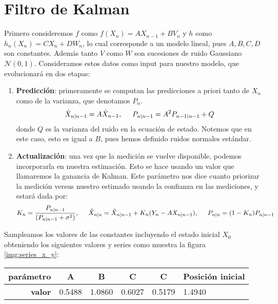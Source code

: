 \documentclass[letterpaper,11pt,oneside]{article}
\begin{document}
\section{Filtro de Kalman}
Primero consideremos $f$ como $ f(X_n) = A X_{n-1} + B V_n$ y $h$ como $ h_n(X_n) = C X_n + DW_n$, lo cual corresponde a un modelo lineal, pues $A,B,C,D$ son constantes. Además tanto $V$ como $W$ son sucesiones de ruido Gaussiano $\mathcal{N}(0,1)$. Consideramos estos datos como input para nuestro modelo, que evolucionará en dos etapas:
\begin{enumerate}
    \item \textbf{Predicción}: primeramente se computan las predicciones a priori tanto de $X_n$ como de la varianza, que denotamos $P_n$.
    $$ \hat X_{n|n-1} = A \hat X_{n-1},\hspace{.5cm} P_{n|n-1} = A^2 P_{n-1|n-1} + Q$$
    donde $Q$ es la varianza del ruido en la ecuación de estado. Notemos que en este caso, esto es igual a $B$, pues hemos definido ruidos normales estándar.
    \item \textbf{Actualización}: una vez que la medición se vuelve disponible, podemos incorporarla en nuestra estimación. Esto se hace usando un valor que llamaremos la ganancia de Kalman. Este parámetro nos dice cuanto priorizar la medición versus nuestro estimado usando la confianza en las mediciones, y estará dada por:
    $$ K_n = \frac{P_{n|n-1}}{(P_{n|n-1}+\sigma^2)},\hspace{.5cm} \hat X_{n|n}=\hat X_{n|n-1}+K_n(Y_n-AX_{n|n-1}),\hspace{.5cm} P_{n|n}=(1-K_n)P_{n|n-1}$$
\end{enumerate}

Sampleamos los valores de las constantes incluyendo el estado inicial $X_0$ obteniendo los siguientes valores y series como muestra la figura \ref{img:series_x_y}:

\begin{table}
\begin{tabular}{|c|c|c|l|l|l|}
\hline
\textbf{parámetro}                   & \textbf{A}                  & \textbf{B}                  & \multicolumn{1}{c|}{\textbf{C}} & \multicolumn{1}{c|}{\textbf{C}} & \multicolumn{1}{c|}{\textbf{Posición inicial}} \\ \hline
\multicolumn{1}{|r|}{\textbf{valor}} & \multicolumn{1}{r|}{0.5488} & \multicolumn{1}{r|}{1.0860} & 0.6027                          & 0.5179                          & 1.4940                                         \\ \hline
\end{tabular}
\end{table}
\end{document}
